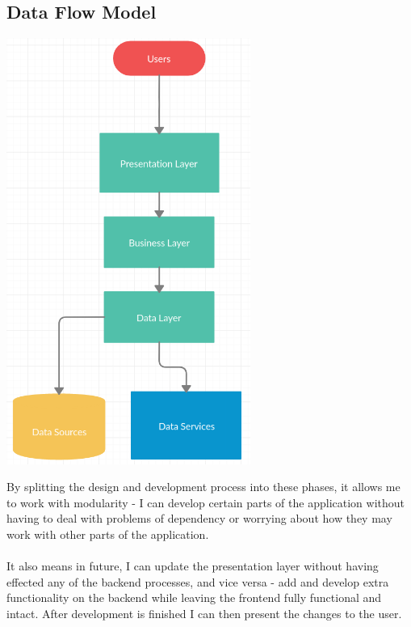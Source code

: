 \documentclass[a4paper,11pt]{proc}
\begin{document}
\subsection{Data Flow Model}
\begin{center}
    \includegraphics[width=8cm]{DataFlow.png}
\end{center}
By splitting the design and development process into these phases, it allows me to work with modularity - I can develop certain parts of the application without having to deal with problems of dependency or worrying about how they may work with other parts of the application.\\
\\It also means in future, I can update the presentation layer without having effected any of the backend processes, and vice versa - add and develop extra functionality on the backend while leaving the frontend fully functional and intact. After development is finished I can then present the changes to the user.\\
\end{document}
